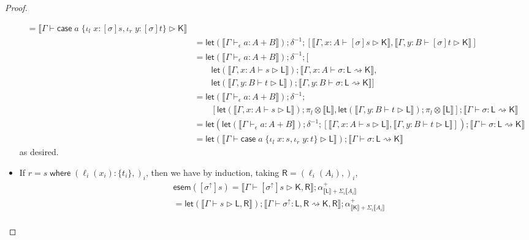 \documentclass[acmsmall,screen,review]{acmart}
\newcommand{\ms}[1]{\ensuremath{\mathsf{#1}}}
\newcommand{\lto}{:}
\newcommand{\linl}[1]{\iota_l\;{#1}}
\newcommand{\linr}[1]{\iota_r\;{#1}}
\newcommand{\casestmt}[5]{\ms{case}\;#1\;\{\linl{#2} \lto #3, \linr{#4} \lto #5\}}
\newcommand{\where}[2]{#1\;\ms{where}\;#2}
\newcommand{\wbranch}[3]{#1(#2) \lto \{#3\}}
\newcommand{\upg}[1]{{#1}^\uparrow}
\newcommand{\bhyp}[2]{#1 : #2}
\newcommand{\hasty}[4]{#1 \vdash_{#2} #3: {#4}}
\newcommand{\haslb}[3]{#1 \vdash #2 \rhd #3}
\newcommand{\lbsubst}[4]{#1 \vdash #2: #3 \rightsquigarrow #4}
\newcommand{\dnt}[1]{\llbracket{#1}\rrbracket}
\newcommand{\entrymor}[1]{\ms{esem}(#1)}
\newcommand{\lmor}[1]{\ms{let}(#1)}
\begin{document}
\begin{proof}
\begin{itemize}[leftmargin=*]
\begin{equation}
\begin{aligned}
          = \dnt{\haslb{\Gamma}{\casestmt{a}{x}{[\sigma]s}{y}{[\sigma]t}}{\ms{K}}} \\
        & = \lmor{\dnt{\hasty{\Gamma}{\epsilon}{a}{A + B}}} ; \delta^{-1}
          ; [\dnt{\haslb{\Gamma, \bhyp{x}{A}}{[\sigma]s}{\ms{K}}}, 
              \dnt{\haslb{\Gamma, \bhyp{y}{B}}{[\sigma]t}{\ms{K}}}] \\
        & = \lmor{\dnt{\hasty{\Gamma}{\epsilon}{a}{A + B}}} ; \delta^{-1} ; [
        \\ & \qquad 
            \lmor{\dnt{\haslb{\Gamma, \bhyp{x}{A}}{s}{\ms{L}}}} 
              ; \dnt{\lbsubst{\Gamma, \bhyp{x}{A}}{\sigma}{\ms{L}}{\ms{K}}},
        \\ & \qquad
            \lmor{\dnt{\haslb{\Gamma, \bhyp{y}{B}}{t}{\ms{L}}}}
              ; \dnt{\lbsubst{\Gamma, \bhyp{y}{B}}{\sigma}{\ms{L}}{\ms{K}}}
          ] \\
        & = \lmor{\dnt{\hasty{\Gamma}{\epsilon}{a}{A + B}}} ; \delta^{-1} ;
        \\ & \qquad [
              \lmor{\dnt{\haslb{\Gamma, \bhyp{x}{A}}{s}{\ms{L}}}} ; \pi_l \otimes \dnt{\ms{L}}, 
              \lmor{\dnt{\haslb{\Gamma, \bhyp{y}{B}}{t}{\ms{L}}}} ; \pi_l \otimes \dnt{\ms{L}}] 
          ; \dnt{\lbsubst{\Gamma}{\sigma}{\ms{L}}{\ms{K}}} \\
        & = \lmor{
            \lmor{\dnt{\hasty{\Gamma}{\epsilon}{a}{A + B}}} 
            ; \delta^{-1} 
            ; [\dnt{\haslb{\Gamma, \bhyp{x}{A}}{s}{\ms{L}}}, 
              \dnt{\haslb{\Gamma, \bhyp{y}{B}}{t}{\ms{L}}}]}
          ; \dnt{\lbsubst{\Gamma}{\sigma}{\ms{L}}{\ms{K}}} \\
        & = \lmor{\dnt{\haslb{\Gamma}{\casestmt{a}{x}{s}{y}{t}}{\ms{L}}}}
          ; \dnt{\lbsubst{\Gamma}{\sigma}{\ms{L}}{\ms{K}}}
      \end{aligned}
    \end{equation}
    as desired.
    \item If $r = \where{s}{(\wbranch{\ell_i}{x_i}{t_i},)_i}$, then we have by induction,
    taking $\ms{R} = (\ell_i(A_i),)_i$,
    \begin{equation}
      \begin{aligned}
        & \entrymor{[\upg{\sigma}]s} 
          = \dnt{\haslb{\Gamma}{[\upg{\sigma}]s}{\ms{K}, \ms{R}}}
          ; \alpha^+_{\dnt{\ms{L}} + \Sigma_i \dnt{A_i}} \\
        & = \lmor{\dnt{\haslb{\Gamma}{s}{\ms{L}, \ms{R}}}}
          ; \dnt{\lbsubst{\Gamma}{\upg{\sigma}}{\ms{L}, \ms{R}}{\ms{K}, \ms{R}}}
          ; \alpha^+_{\dnt{\ms{K}} + \Sigma_i \dnt{A_i}} \\

\end{aligned}
\end{equation}
\end{itemize}
\end{proof}
\end{document}
